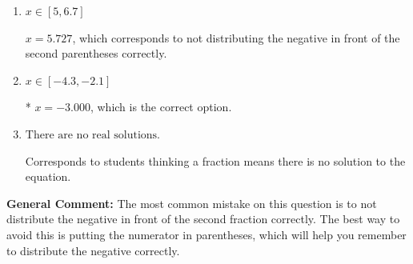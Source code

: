 \documentclass{extbook}[14pt]
\begin{document}
\begin{enumerate}
{\begin{enumerate}[label=\Alph*.]
$x = -1.033$, which corresponds to getting the negative of the actual solution.
\item \( x \in [5, 6.7] \)

$x = 5.727$, which corresponds to not distributing the negative in front of the second parentheses correctly.
\item \( x \in [-4.3, -2.1] \)

* $x = -3.000$, which is the correct option.
\item \( \text{There are no real solutions.} \)

Corresponds to students thinking a fraction means there is no solution to the equation.
\end{enumerate}

\textbf{General Comment:} The most common mistake on this question is to not distribute the negative in front of the second fraction correctly. The best way to avoid this is putting the numerator in parentheses, which will help you remember to distribute the negative correctly.
}
\end{enumerate}
\end{document}
